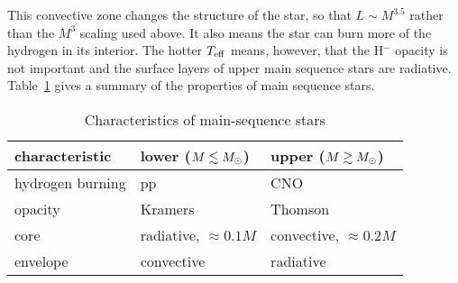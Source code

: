 This convective zone changes the structure of the star, so that $L\sim M^{3.5}$ rather than the $M^{3}$ scaling used above.  It also means the star can burn more of the hydrogen in its interior.  The hotter $T_{\mathrm{eff}}$ means, however, that the H$^{-}$ opacity is not important and the surface layers of upper main sequence stars are radiative.  Table~\ref{t.MS-characteristics} gives a summary of the properties of main sequence stars.

\begin{table}
\caption{\label{t.MS-characteristics} Characteristics of main-sequence stars}
\centering
\begin{tabular}{lll}
\hline
characteristic & lower ($M\lesssim M_\odot$) & upper ($M\gtrsim M_\odot$)\\
\hline\hline
hydrogen burning & pp & CNO\\
opacity & Kramers & Thomson\\
core & radiative, $\approx 0.1M$  & convective, $\approx 0.2 M$\\
envelope & convective & radiative\\
\hline
\end{tabular}
\end{table}

